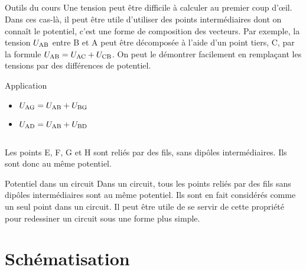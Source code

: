 \documentclass[10pt,a5paper,notitlepage]{book}
\begin{document}
\subsection{}
	\begin{NCdemo}{Outils du cours}
		Une tension peut être difficile à calculer au premier coup d'{\oe}il. Dans ces cas-là, il peut être utile d'utiliser des points intermédiaires dont on connaît le potentiel, c'est une forme de composition des vecteurs. Par exemple, la tension $U_{\rm AB}$ entre B et A peut être décomposée à l'aide d'un point tiers, C, par la formule $U_{\rm AB} = U_{\rm AC} + U_{\rm CB}$. On peut le démontrer facilement en remplaçant les tensions par des différences de potentiel.
	\end{NCdemo}
	\begin{NCexem}{Application}
		\begin{itemize}
			\item $U_{\rm AG} = U_{\rm AB} + U_{\rm BG}$
			\item $U_{\rm AD} = U_{\rm AB} + U_{\rm BD}$
		\end{itemize}
	\end{NCexem}
\subsection{}
Les points E, F, G et H sont reliés par des fils, sans dipôles intermédiaires. Ils sont donc au même potentiel.
\begin{impo}{Potentiel dans un circuit}
	\label{def:potentiel}
	Dans un circuit, tous les points reliés par des fils sans dipôles intermédiaires sont au même potentiel. Ils sont en fait considérés comme un seul point dans un circuit. Il peut être utile de se servir de cette propriété pour redessiner un circuit sous une forme plus simple.
\end{impo}

\section{Schématisation}
\end{document}
